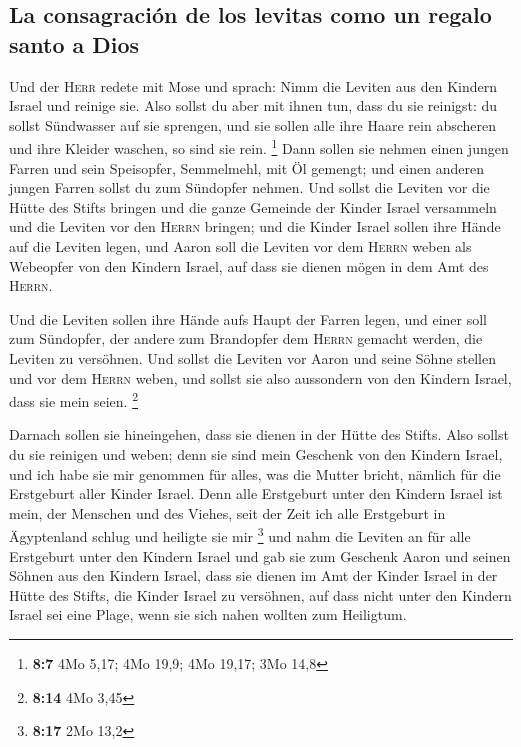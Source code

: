 \hypertarget{la-consagraciuxf3n-de-los-levitas-como-un-regalo-santo-a-dios}{%
\subsection{La consagración de los levitas como un regalo santo a
Dios}\label{la-consagraciuxf3n-de-los-levitas-como-un-regalo-santo-a-dios}}

 Und der \textsc{Herr} redete mit Mose und sprach:
 Nimm die Leviten aus den Kindern Israel und reinige sie.
 Also sollst du aber mit ihnen tun, dass du sie reinigst:
du sollst Sündwasser auf sie sprengen, und sie sollen alle ihre Haare
rein abscheren und ihre Kleider waschen, so sind sie rein. \footnote{\textbf{8:7}
  4Mo 5,17; 4Mo 19,9; 4Mo 19,17; 3Mo 14,8}  Dann sollen
sie nehmen einen jungen Farren und sein Speisopfer, Semmelmehl, mit Öl
gemengt; und einen anderen jungen Farren sollst du zum Sündopfer nehmen.
 Und sollst die Leviten vor die Hütte des Stifts bringen
und die ganze Gemeinde der Kinder Israel versammeln  und
die Leviten vor den \textsc{Herrn} bringen; und die Kinder Israel sollen
ihre Hände auf die Leviten legen,  und Aaron soll die
Leviten vor dem \textsc{Herrn} weben als Webeopfer von den Kindern
Israel, auf dass sie dienen mögen in dem Amt des \textsc{Herrn}.

 Und die Leviten sollen ihre Hände aufs Haupt der Farren
legen, und einer soll zum Sündopfer, der andere zum Brandopfer dem
\textsc{Herrn} gemacht werden, die Leviten zu versöhnen. 
Und sollst die Leviten vor Aaron und seine Söhne stellen und vor dem
\textsc{Herrn} weben,  und sollst sie also aussondern von
den Kindern Israel, dass sie mein seien. \footnote{\textbf{8:14} 4Mo
  3,45}

 Darnach sollen sie hineingehen, dass sie dienen in der
Hütte des Stifts. Also sollst du sie reinigen und weben; 
denn sie sind mein Geschenk von den Kindern Israel, und ich habe sie mir
genommen für alles, was die Mutter bricht, nämlich für die Erstgeburt
aller Kinder Israel.  Denn alle Erstgeburt unter den
Kindern Israel ist mein, der Menschen und des Viehes, seit der Zeit ich
alle Erstgeburt in Ägyptenland schlug und heiligte sie mir \footnote{\textbf{8:17}
  2Mo 13,2}  und nahm die Leviten an für alle Erstgeburt
unter den Kindern Israel  und gab sie zum Geschenk Aaron
und seinen Söhnen aus den Kindern Israel, dass sie dienen im Amt der
Kinder Israel in der Hütte des Stifts, die Kinder Israel zu versöhnen,
auf dass nicht unter den Kindern Israel sei eine Plage, wenn sie sich
nahen wollten zum Heiligtum.

